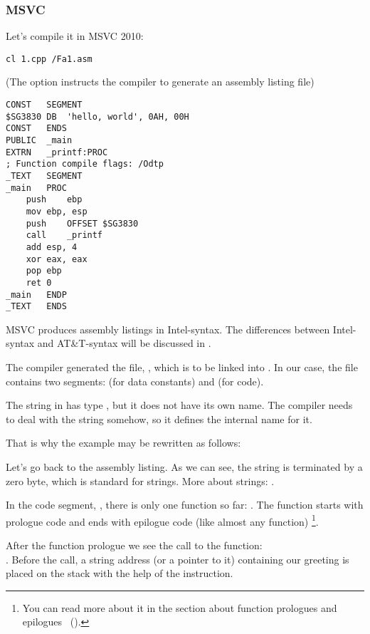 \subsubsection{MSVC}

Let's compile it in MSVC 2010:

\begin{lstlisting}
cl 1.cpp /Fa1.asm
\end{lstlisting}

(The  option instructs the compiler to generate an assembly listing file)

\begin{lstlisting}[caption=MSVC 2010,style=customasmx86]
CONST	SEGMENT
$SG3830	DB	'hello, world', 0AH, 00H
CONST	ENDS
PUBLIC	_main
EXTRN	_printf:PROC
; Function compile flags: /Odtp
_TEXT	SEGMENT
_main	PROC
	push	ebp
	mov	ebp, esp
	push	OFFSET $SG3830
	call	_printf
	add	esp, 4
	xor	eax, eax
	pop	ebp
	ret	0
_main	ENDP
_TEXT	ENDS
\end{lstlisting}

MSVC produces assembly listings in Intel-syntax.
The differences between Intel-syntax and AT\&T-syntax will be discussed in .

The compiler generated the file, , which is to be linked into .
In our case, the file contains two segments:  (for data constants) and  (for code).

\label{string_is_const_char}
The string  in \CCpp has type , but it does not have its own name.
The compiler needs to deal with the string somehow, so it defines the internal name  for it.

That is why the example may be rewritten as follows:



Let's go back to the assembly listing. As we can see, the string is terminated by a zero byte, which is standard for \CCpp strings.
More about \CCpp strings: .

In the code segment, , there is only one function so far: \main{}.
The function \main starts with prologue code and ends with epilogue code (like almost any function)
\footnote{You can read more about it in the section about function prologues and epilogues ~().}.

After the function prologue we see the call to the \printf{} function:\\
.
Before the call, a string address (or a pointer to it) containing our greeting is placed on the stack with the help of the \PUSH instruction.

